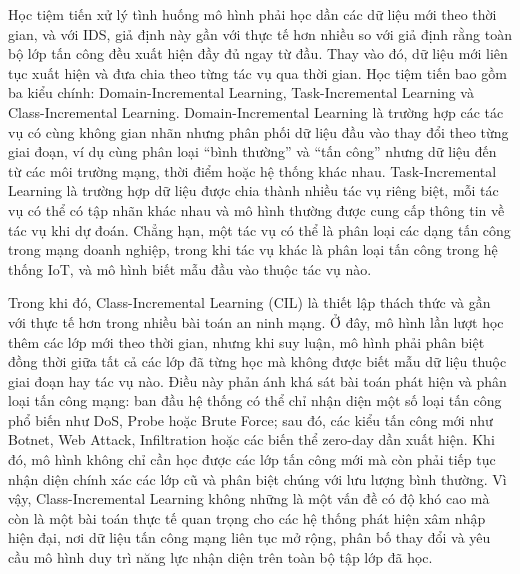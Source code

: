 Học tiệm tiến xử lý tình huống mô hình phải học dần các dữ liệu mới theo thời gian, và với IDS, giả định này gần với thực tế hơn nhiều so với giả định rằng toàn bộ lớp tấn công đều xuất hiện đầy đủ ngay từ đầu. Thay vào đó, dữ liệu mới liên tục xuất hiện và đưa chia theo từng tác vụ qua thời gian. Học tiệm tiến bao gồm ba kiểu chính: Domain-Incremental Learning, Task-Incremental Learning và Class-Incremental Learning. Domain-Incremental Learning là trường hợp các tác vụ có cùng không gian nhãn nhưng phân phối dữ liệu đầu vào thay đổi theo từng giai đoạn, ví dụ cùng phân loại “bình thường” và “tấn công” nhưng dữ liệu đến từ các môi trường mạng, thời điểm hoặc hệ thống khác nhau. Task-Incremental Learning là trường hợp dữ liệu được chia thành nhiều tác vụ riêng biệt, mỗi tác vụ có thể có tập nhãn khác nhau và mô hình thường được cung cấp thông tin về tác vụ khi dự đoán. Chẳng hạn, một tác vụ có thể là phân loại các dạng tấn công trong mạng doanh nghiệp, trong khi tác vụ khác là phân loại tấn công trong hệ thống IoT, và mô hình biết mẫu đầu vào thuộc tác vụ nào.

Trong khi đó, Class-Incremental Learning (CIL) là thiết lập thách thức và gần với thực tế hơn trong nhiều bài toán an ninh mạng. Ở đây, mô hình lần lượt học thêm các lớp mới theo thời gian, nhưng khi suy luận, mô hình phải phân biệt đồng thời giữa tất cả các lớp đã từng học mà không được biết mẫu dữ liệu thuộc giai đoạn hay tác vụ nào. Điều này phản ánh khá sát bài toán phát hiện và phân loại tấn công mạng: ban đầu hệ thống có thể chỉ nhận diện một số loại tấn công phổ biến như DoS, Probe hoặc Brute Force; sau đó, các kiểu tấn công mới như Botnet, Web Attack, Infiltration hoặc các biến thể zero-day dần xuất hiện. Khi đó, mô hình không chỉ cần học được các lớp tấn công mới mà còn phải tiếp tục nhận diện chính xác các lớp cũ và phân biệt chúng với lưu lượng bình thường. Vì vậy, Class-Incremental Learning không những là một vấn đề có độ khó cao mà còn là một bài toán thực tế quan trọng cho các hệ thống phát hiện xâm nhập hiện đại, nơi dữ liệu tấn công mạng liên tục mở rộng, phân bố thay đổi và yêu cầu mô hình duy trì năng lực nhận diện trên toàn bộ tập lớp đã học.

